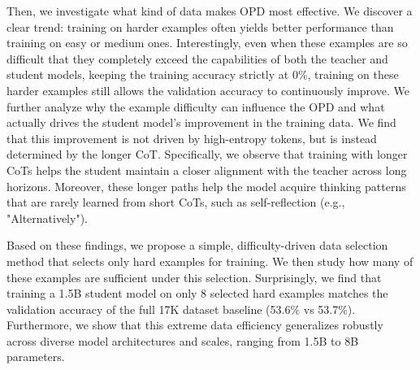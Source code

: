 Then, we investigate what kind of data makes OPD most effective. We discover a clear trend: training on harder examples often yields better performance than training on easy or medium ones. Interestingly, even when these examples are so difficult that they completely exceed the capabilities of both the teacher and student models, keeping the training accuracy strictly at 0\%, training on these harder examples still allows the validation accuracy to continuously improve. We further analyze why the example difficulty can influence the OPD and what actually drives the student model's improvement in the training data. We find that this improvement is not driven by high-entropy tokens, but is instead determined by the longer CoT. Specifically, we observe that training with longer CoTs helps the student maintain a closer alignment with the teacher across long horizons. Moreover, these longer paths help the model acquire thinking patterns that are rarely learned from short CoTs, such as self-reflection (e.g., "Alternatively").

Based on these findings, we propose a simple, difficulty-driven data selection method that selects only hard examples for training. We then study how many of these examples are sufficient under this selection. Surprisingly, we find that training a 1.5B student model on only 8 selected hard examples matches the validation accuracy of the full 17K dataset baseline (53.6\% vs 53.7\%). Furthermore, we show that this extreme data efficiency generalizes robustly across diverse model architectures and scales, ranging from 1.5B to 8B parameters.
